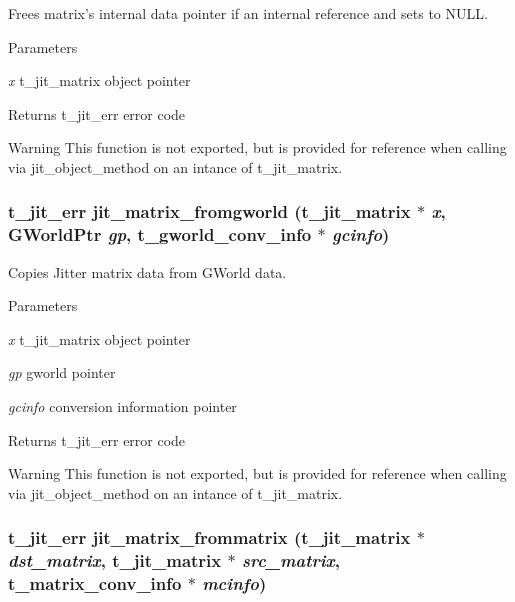 Frees matrix's internal data pointer if an internal reference and sets to NULL. 
\begin{DoxyParams}{Parameters}
\item[{\em x}]t\_\-jit\_\-matrix object pointer\end{DoxyParams}
\begin{DoxyReturn}{Returns}
t\_\-jit\_\-err error code
\end{DoxyReturn}
\begin{DoxyWarning}{Warning}
This function is not exported, but is provided for reference when calling via jit\_\-object\_\-method on an intance of t\_\-jit\_\-matrix. 
\end{DoxyWarning}
\hypertarget{group__matrixmod_ga5413151392a8876a78cd2f66b4a23279}{
\subsubsection[{jit\_\-matrix\_\-fromgworld}]{\setlength{\rightskip}{0pt plus 5cm}t\_\-jit\_\-err jit\_\-matrix\_\-fromgworld (t\_\-jit\_\-matrix $\ast$ {\em x}, \/  GWorldPtr {\em gp}, \/  t\_\-gworld\_\-conv\_\-info $\ast$ {\em gcinfo})}}
\label{group__matrixmod_ga5413151392a8876a78cd2f66b4a23279}


Copies Jitter matrix data from GWorld data. 
\begin{DoxyParams}{Parameters}
\item[{\em x}]t\_\-jit\_\-matrix object pointer \item[{\em gp}]gworld pointer \item[{\em gcinfo}]conversion information pointer\end{DoxyParams}
\begin{DoxyReturn}{Returns}
t\_\-jit\_\-err error code
\end{DoxyReturn}
\begin{DoxyWarning}{Warning}
This function is not exported, but is provided for reference when calling via jit\_\-object\_\-method on an intance of t\_\-jit\_\-matrix. 
\end{DoxyWarning}
\hypertarget{group__matrixmod_gaec5dd25f1111bb4efab4b2e3fdced43e}{
\subsubsection[{jit\_\-matrix\_\-frommatrix}]{\setlength{\rightskip}{0pt plus 5cm}t\_\-jit\_\-err jit\_\-matrix\_\-frommatrix (t\_\-jit\_\-matrix $\ast$ {\em dst\_\-matrix}, \/  t\_\-jit\_\-matrix $\ast$ {\em src\_\-matrix}, \/  {\bf t\_\-matrix\_\-conv\_\-info} $\ast$ {\em mcinfo})}}
\label{group__matrixmod_gaec5dd25f1111bb4efab4b2e3fdced43e}



